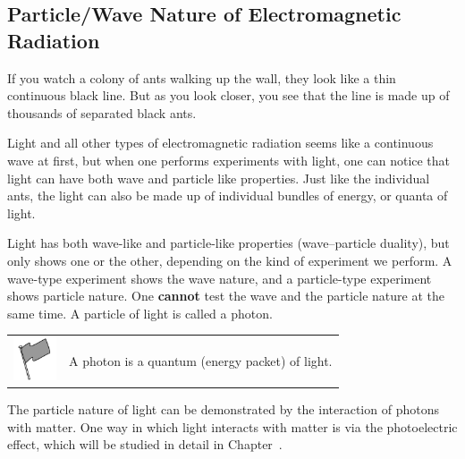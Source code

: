            \subsection{ Particle/Wave Nature of Electromagnetic Radiation}
            \nopagebreak
      \label{m38777*id186686}If you watch a colony of ants walking up the wall, they look like a thin continuous black line. But as you look closer, you see that the line is made up of thousands of separated black ants.\par 
      \label{m38777*id187029}Light and all other types of electromagnetic radiation seems like a continuous wave at first, but when one performs experiments with light, one can notice that light can have both wave and particle like properties. Just like the individual ants, the light can also be made up of individual bundles of energy, or quanta of light.\par 
      \label{m38777*id187035}Light has both wave-like and particle-like properties (wave--particle duality), but only shows one or the other, depending on the kind of experiment we perform. A wave-type experiment shows the wave nature, and a particle-type experiment shows particle nature. One \textbf{cannot} test the wave and the particle nature at the same time. A particle of light is called a photon.\par 
\label{m38777*fhsst!!!underscore!!!id75}\begin{definition}
	  \begin{tabular*}{15 cm}{m{15 mm}m{}}
	\hspace*{-50pt}  \includegraphics[width=0.5in]{col11305.imgs/psflag2.png}   & \Definition{   \label{id2452276}\textbf{ Photon }} { \label{m38777*meaningfhsst!!!underscore!!!id75}
      \label{m38777*id187051}A photon is a quantum (energy packet) of light. \par 
       } 
      \end{tabular*}
      \end{definition}
      \label{m38777*id187062}The particle nature of light can be demonstrated by the interaction of photons with matter. One way in which light interacts with matter is via the photoelectric effect, which will be studied in detail in Chapter~.\par 
\label{m38777*secfhsst!!!underscore!!!id79}
